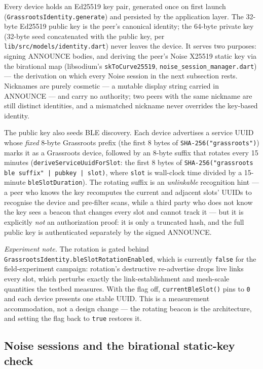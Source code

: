 \documentclass[11pt]{report}
\newcommand{\code}[1]{\texttt{\small #1}}
\begin{document}
Every device holds an Ed25519 key pair, generated once on first launch (\code{GrassrootsIdentity.generate}) and persisted by the application layer. The 32-byte Ed25519 public key is the peer's canonical identity; the 64-byte private key (32-byte seed concatenated with the public key, per \code{lib/src/models/identity.dart}) never leaves the device. It serves two purposes: signing ANNOUNCE bodies, and deriving the peer's Noise X25519 static key via the birational map (libsodium's \code{skToCurve25519}, \code{noise\_session\_manager.dart}) --- the derivation on which every Noise session in the next subsection rests. Nicknames are purely cosmetic — a mutable display string carried in ANNOUNCE — and carry no authority; two peers with the same nickname are still distinct identities, and a mismatched nickname never overrides the key-based identity.

The public key also seeds BLE discovery. Each device advertises a service UUID whose \emph{fixed} 8-byte Grassroots prefix (the first 8 bytes of \code{SHA-256("grassroots")}) marks it as a Grassroots device, followed by an 8-byte suffix that rotates every 15 minutes (\code{deriveServiceUuidForSlot}: the first 8 bytes of \code{SHA-256("grassroots ble suffix" | pubkey | slot)}, where \code{slot} is wall-clock time divided by a 15-minute \code{bleSlotDuration}). The rotating suffix is an \emph{unlinkable} recognition hint — a peer who knows the key recomputes the current and adjacent slots' UUIDs to recognise the device and pre-filter scans, while a third party who does not know the key sees a beacon that changes every slot and cannot track it — but it is explicitly \emph{not} an authorization proof: it is only a truncated hash, and the full public key is authenticated separately by the signed ANNOUNCE.

\emph{Experiment note.} The rotation is gated behind \code{GrassrootsIdentity.bleSlotRotationEnabled}, which is currently \code{false} for the field-experiment campaign: rotation's destructive re-advertise drops live links every slot, which perturbs exactly the link-establishment and mesh-scale quantities the testbed measures. With the flag off, \code{currentBleSlot()} pins to \code{0} and each device presents one stable UUID. This is a measurement accommodation, not a design change --- the rotating beacon is the architecture, and setting the flag back to \code{true} restores it.

\subsection{Noise sessions and the birational static-key check}
\end{document}
